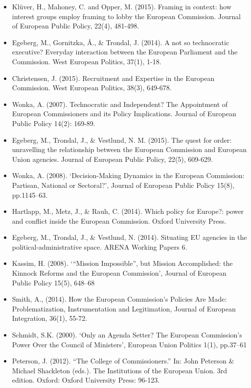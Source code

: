 \begin{itemize}
	\item Kl{\"u}ver, H., Mahoney, C. and Opper, M. (2015). Framing in context: how interest groups employ framing to lobby the European Commission. Journal of European Public Policy, 22(4), 481-498.
	\item Egeberg, M., Gornitzka, Å., \& Trondal, J. (2014). A not so technocratic executive? Everyday interaction between the European Parliament and the Commission. West European Politics, 37(1), 1-18.
	\item Christensen, J. (2015). Recruitment and Expertise in the European Commission. West European Politics, 38(3), 649-678.
	\item Wonka, A. (2007). Technocratic and Independent? The Appointment of European Commissioners and its Policy Implications. Journal of European Public Policy 14(2): 169-89.
	\item Egeberg, M., Trondal, J., \& Vestlund, N. M. (2015). The quest for order: unravelling the relationship between the European Commission and European Union agencies. Journal of European Public Policy, 22(5), 609-629.
	\item Wonka, A. (2008). ‘Decision-Making Dynamics in the European Commission: Partisan, National or Sectoral?’, Journal of European Public Policy 15(8), pp.1145–63.
	\item Hartlapp, M., Metz, J., \& Rauh, C. (2014). Which policy for Europe?: power and conflict inside the European Commission. Oxford University Press.
	\item Egeberg, M., Trondal, J., \& Vestlund, N. (2014). Situating EU agencies in the political-administrative space. ARENA Working Papers 6.
    \item Kassim, H. (2008). ‘“Mission Impossible”, but Mission Accomplished: the Kinnock Reforms and the European Commission’, Journal of European Public Policy 15(5), 648–68
    \item Smith, A., (2014). How the European Commission’s Policies Are Made: Problematization, Instrumentation and Legitimation, Journal of European Integration, 36(1), 55-72.
    \item Schmidt, S.K. (2000). ‘Only an Agenda Setter? The European Commission’s Power Over the Council of Ministers’, European Union Politics 1(1), pp.37–61
    \item Peterson, J. (2012). “The College of Commissioners.” In: John Peterson \& Michael Shackleton (eds.). The Institutions of the European Union. 3rd edition. Oxford: Oxford University Press: 96-123.

\end{itemize}
